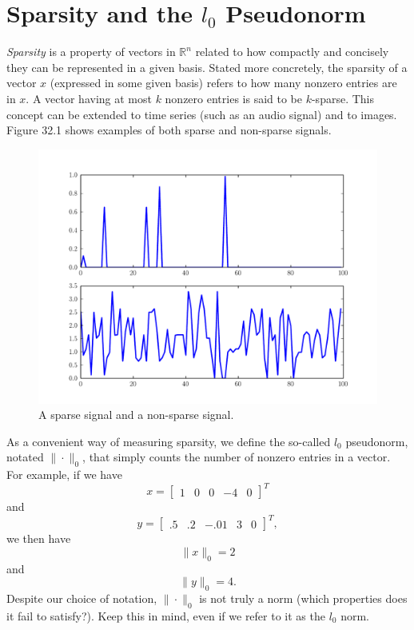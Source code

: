 \section*{Sparsity and the $l_0$ Pseudonorm}
\emph{Sparsity} is a property of vectors in $\mathbb{R}^n$ related to how compactly and concisely they can
be represented in a given basis. Stated more concretely, the sparsity of a vector $x$ (expressed in some given
basis) refers to how many nonzero entries are in $x$. A vector having at most $k$ nonzero entries is said to be
$k$-sparse. This concept can be extended to time series (such as an audio signal) and to images. Figure 32.1 shows
examples of both sparse and non-sparse signals.

\begin{figure}
\centering
\includegraphics[width=\textwidth]{sparse.pdf}
\caption{A sparse signal and a non-sparse signal.}
\label{fig:sparse}
\end{figure}

As a convenient way of measuring sparsity, we define the so-called $l_0$ pseudonorm, notated $\|\cdot\|_0$,
that simply counts the number of nonzero entries in a vector. For example, if we have
\[
x = 
\begin{bmatrix}
1&0&0&-4&0
\end{bmatrix}^T
\]
and
\[
y = 
\begin{bmatrix}
.5&.2&-.01&3&0
\end{bmatrix}^T,
\]
we then have
\[
\|x\|_0 = 2
\]
and
\[
\|y\|_0 = 4.
\]
Despite our choice of notation, $\|\cdot\|_0$ is not truly a norm (which properties does it fail to satisfy?).
Keep this in mind, even if we refer to it as the $l_0$ norm. 

